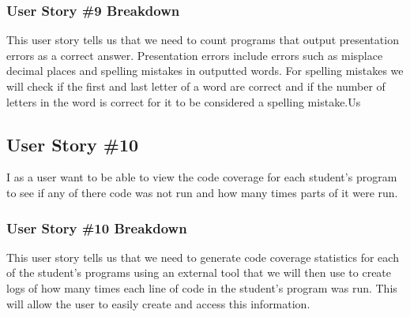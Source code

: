 \subsubsection{User Story \#9 Breakdown}
This user story tells us that we need to count programs that output presentation errors as a correct answer. Presentation errors include errors such as misplace decimal places and spelling mistakes in outputted words. For spelling mistakes we will check if the first and last letter of a word are correct and if the number of letters in the word is correct for it to be considered a spelling mistake.Us

\subsection{User Story \#10}
I as a user want to be able to view the code coverage for each student's program to see if any of there code was not run and how many times parts of it were run.

\subsubsection{User Story \#10 Breakdown}
This user story tells us that we need to generate code coverage statistics for each of the student's programs using an external tool that we will then use to create logs of how many times each line of code in the student's program was run. This will allow the user to easily create and access this information.












